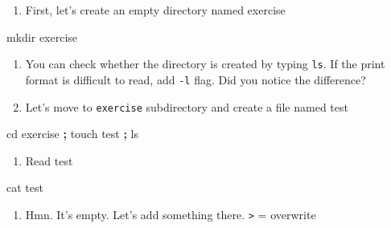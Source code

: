 \documentclass[
]{book}
\newenvironment{Shaded}{\begin{snugshade}}{\end{snugshade}}
\newcommand{\BuiltInTok}[1]{#1}
\newcommand{\FunctionTok}[1]{\textcolor[rgb]{0.00,0.00,0.00}{#1}}
\newcommand{\KeywordTok}[1]{\textcolor[rgb]{0.13,0.29,0.53}{\textbf{#1}}}
\newcommand{\NormalTok}[1]{#1}
\providecommand{\tightlist}{%
  \setlength{\itemsep}{0pt}\setlength{\parskip}{0pt}}
\begin{document}
\begin{enumerate}
\def\labelenumi{\arabic{enumi}.}
\tightlist
\item
  First, let's create an empty directory named exercise
\end{enumerate}

\begin{Shaded}
\begin{Highlighting}[]

\FunctionTok{mkdir}\NormalTok{ exercise }
\end{Highlighting}
\end{Shaded}

\begin{enumerate}
\def\labelenumi{\arabic{enumi}.}
\setcounter{enumi}{1}
\item
  You can check whether the directory is created by typing \texttt{ls}. If the print format is difficult to read, add \texttt{-l} flag. Did you notice the difference?
\item
  Let's move to \texttt{exercise} subdirectory and create a file named test
\end{enumerate}

\begin{Shaded}
\begin{Highlighting}[]

\BuiltInTok{cd}\NormalTok{ exercise }\KeywordTok{;} \FunctionTok{touch}\NormalTok{ test }\KeywordTok{;} \FunctionTok{ls} 
\end{Highlighting}
\end{Shaded}

\begin{enumerate}
\def\labelenumi{\arabic{enumi}.}
\setcounter{enumi}{3}
\tightlist
\item
  Read test
\end{enumerate}

\begin{Shaded}
\begin{Highlighting}[]

\FunctionTok{cat}\NormalTok{ test }
\end{Highlighting}
\end{Shaded}

\begin{enumerate}
\def\labelenumi{\arabic{enumi}.}
\setcounter{enumi}{4}
\tightlist
\item
  Hmn. It's empty. Let's add something there. \texttt{\textgreater{}} = overwrite
\end{enumerate}
\end{document}
